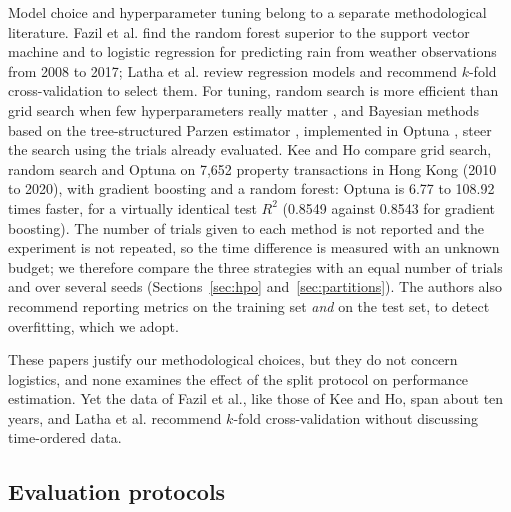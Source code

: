 \documentclass[11pt,a4paper]{article}
\theoremstyle{definition}
\begin{document}
Model choice and hyperparameter tuning belong to a separate methodological literature. Fazil et al. \cite{fazil2023comparative} find the random forest \cite{breiman2001random} superior to the support vector machine and to logistic regression for predicting rain from weather observations from 2008 to 2017; Latha et al. \cite{latha2024overview} review regression models and recommend $k$-fold cross-validation to select them. For tuning, random search is more efficient than grid search when few hyperparameters really matter \cite{bergstra2012random}, and Bayesian methods based on the tree-structured Parzen estimator \cite{bergstra2011algorithms}, implemented in Optuna \cite{akiba2019optuna}, steer the search using the trials already evaluated. Kee and Ho \cite{kee2025optimizing} compare grid search, random search and Optuna on 7{,}652 property transactions in Hong Kong (2010 to 2020), with gradient boosting and a random forest: Optuna is 6.77 to 108.92 times faster, for a virtually identical test $R^2$ (0.8549 against 0.8543 for gradient boosting). The number of trials given to each method is not reported and the experiment is not repeated, so the time difference is measured with an unknown budget; we therefore compare the three strategies with an equal number of trials and over several seeds (Sections~\ref{sec:hpo} and~\ref{sec:partitions}). The authors also recommend reporting metrics on the training set \emph{and} on the test set, to detect overfitting, which we adopt.

These papers justify our methodological choices, but they do not concern logistics, and none examines the effect of the split protocol on performance estimation. Yet the data of Fazil et al., like those of Kee and Ho, span about ten years, and Latha et al. recommend $k$-fold cross-validation without discussing time-ordered data.

\subsection{Evaluation protocols}
\label{sec:rw-protocoles}
\end{document}
